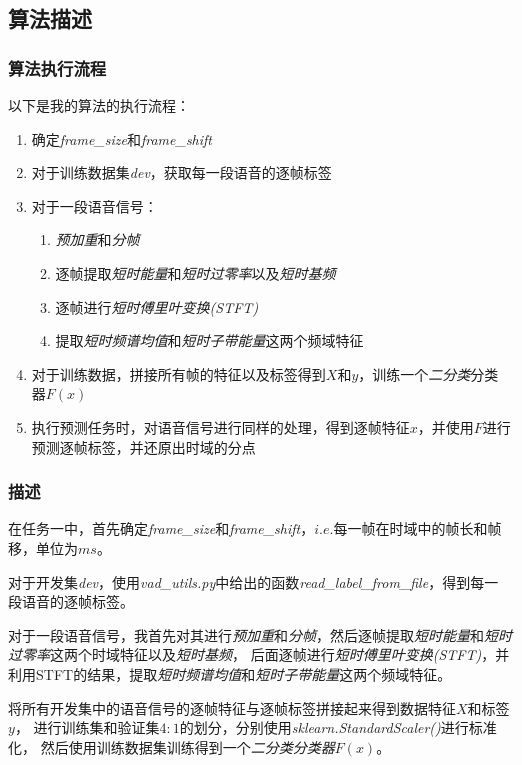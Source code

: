 \documentclass[a4paper]{article}
\begin{document}
\subsection{算法描述}

\subsubsection{算法执行流程}
以下是我的算法的执行流程：
\begin{enumerate}
  \item 确定\emph{frame\_size}和\emph{frame\_shift}
  \item 对于训练数据集\emph{dev}，获取每一段语音的逐帧标签
  \item 
  {
    对于一段语音信号：
    \begin{enumerate}
      \item \emph{预加重}和\emph{分帧}
      \item 逐帧提取\emph{短时能量}和\emph{短时过零率}以及\emph{短时基频}
      \item 逐帧进行\emph{短时傅里叶变换(STFT)}
      \item 提取\emph{短时频谱均值}和\emph{短时子带能量}这两个频域特征
    \end{enumerate}
  }
  \item 对于训练数据，拼接所有帧的特征以及标签得到$X$和$y$，训练一个\emph{二分类}分类器$F(x)$
  \item 执行预测任务时，对语音信号进行同样的处理，得到逐帧特征$x$，并使用$F$进行预测逐帧标签，并还原出时域的分点
\end{enumerate}

\subsubsection{描述}

在任务一中，首先确定\emph{frame\_size}和\emph{frame\_shift}，$i.e.$每一帧在时域中的帧长和帧移，单位为$ms$。

对于开发集\emph{dev}，使用\emph{vad\_utils.py}中给出的函数\emph{read\_label\_from\_file}，得到每一段语音的逐帧标签。

对于一段语音信号，我首先对其进行\emph{预加重}和\emph{分帧}，然后逐帧提取\emph{短时能量}和\emph{短时过零率}这两个时域特征以及\emph{短时基频}，
后面逐帧进行\emph{短时傅里叶变换(STFT)}，并利用STFT的结果，提取\emph{短时频谱均值}和\emph{短时子带能量}这两个频域特征。

将所有开发集中的语音信号的逐帧特征与逐帧标签拼接起来得到数据特征$X$和标签$y$，
进行训练集和验证集$4: 1$的划分，分别使用\emph{sklearn.StandardScaler()}进行标准化，
然后使用训练数据集训练得到一个\emph{二分类分类器}$F(x)$。
\end{document}
